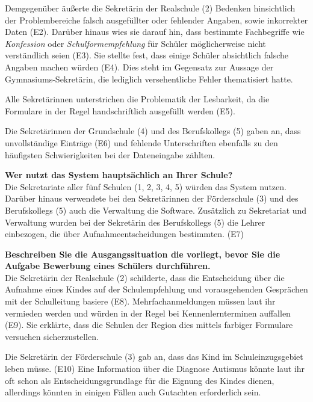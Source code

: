 Demgegenüber äußerte die Sekretärin der Realschule (2) Bedenken hinsichtlich der Problembereiche falsch ausgefüllter oder fehlender Angaben, sowie inkorrekter Daten (E2). Darüber hinaus wies sie darauf hin, dass bestimmte Fachbegriffe wie \textit{Konfession} oder \textit{Schulformempfehlung} für Schüler möglicherweise nicht verständlich seien (E3). Sie stellte fest, dass einige Schüler absichtlich falsche Angaben machen würden (E4). Dies steht im Gegensatz zur Aussage der Gymnasiums-Sekretärin, die lediglich versehentliche Fehler thematisiert hatte. 

Alle Sekretärinnen unterstrichen die Problematik der Lesbarkeit, da die Formulare in der Regel handschriftlich ausgefüllt werden (E5).

Die Sekretärinnen der Grundschule (4) und des Berufskollegs (5) gaben an, dass unvollständige Einträge (E6) und fehlende Unterschriften ebenfalls zu den häufigsten Schwierigkeiten bei der Dateneingabe zählten.


\textbf{Wer nutzt das System hauptsächlich an Ihrer Schule?}\\
Die Sekretariate aller fünf Schulen (1, 2, 3, 4, 5) würden das System nutzen. Darüber hinaus verwendete bei den Sekretärinnen der Förderschule (3) und des Berufskollegs (5) auch die Verwaltung die Software. Zusätzlich zu Sekretariat und Verwaltung wurden bei der Sekretärin des Berufskollegs (5) die Lehrer einbezogen, die über Aufnahmeentscheidungen bestimmten. (E7)


\textbf{Beschreiben Sie die Ausgangssituation die vorliegt, bevor Sie die Aufgabe \glqq Bewerbung eines Schülers\grqq{} durchführen.}\\
Die Sekretärin der Realschule (2) schilderte, dass die Entscheidung über die Aufnahme eines Kindes auf der Schulempfehlung und vorausgehenden Gesprächen mit der Schulleitung basiere (E8). Mehrfachanmeldungen müssen laut ihr vermieden werden und würden in der Regel bei Kennenlernterminen auffallen (E9). Sie erklärte, dass die Schulen der Region dies mittels farbiger Formulare versuchen sicherzustellen.

Die Sekretärin der Förderschule (3) gab an, dass das Kind im Schuleinzugsgebiet leben müsse. (E10) Eine Information über die Diagnose Autismus könnte laut ihr oft schon als Entscheidungsgrundlage für die Eignung des Kindes dienen, allerdings könnten in einigen Fällen auch Gutachten erforderlich sein.


